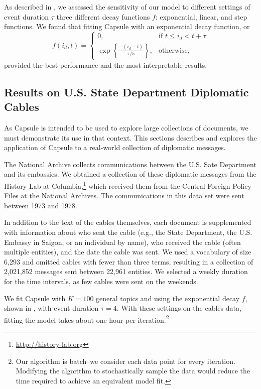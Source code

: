 As described in , we assessed the sensitivity of our model to different settings of event duration $\tau$ three different decay functions $f$: exponential, linear, and step functions.  We found that fitting Capsule with an exponential decay function, or
\begin{equation}
f(i_d, t) =
\begin{cases}
    0,			& \text{if } t \le i_d < t + \tau\\
    \exp\left\{\frac{-(i_d - t)}{\tau/5}\right\},          & \text{otherwise,}
\end{cases}
\label{eq:f}
\end{equation}
provided the best performance and the most interpretable results.





\subsection{Results on U.S. State Department Diplomatic Cables}

As Capsule is intended to be used to explore large collections of documents, we must demonstrate its use in that context.  This sections describes and explores the application of Capsule to a real-world collection of diplomatic messages.

The National Archive collects communications between the U.S. Sate Department and its embassies.  We obtained a collection of these diplomatic messages from the History Lab at Columbia,\footnote{\url{http://history-lab.org}} which received them from the Central Foreign Policy Files at the National Archives.  The communications in this data set were sent between 1973 and 1978.

In addition to the text of the cables themselves, each document is supplemented with information about who sent the cable (e.g., the State Department, the U.S. Embassy in Saigon, or an individual by name), who received the cable (often multiple entities), and the date the cable was sent.  We used a vocabulary of size 6,293 and omitted cables with fewer than three terms, resulting in a collection of 2,021,852 messages sent between 22,961 entities.  We selected a weekly duration for the time intervals, as few cables were sent on the weekends.

We fit Capsule with $K=100$ general topics and using the exponential decay $f$, shown in , with event duration $\tau=4$.  With these settings on the cables data, fitting the model takes about one hour per iteration.\footnote{Our algorithm is batch--we consider each data point for every iteration.  Modifying the algorithm to stochastically sample the data would reduce the time required to achieve an equivalent model fit.}

